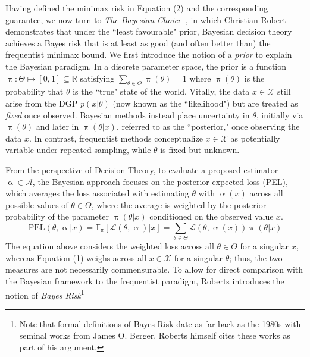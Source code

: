 \documentclass[letterpaper,12pt]{article}
\newcommand{\given}{|}
\begin{document}
Having defined the minimax risk in \hyperref[eq:minimaxrisk]{Equation (2)} and the corresponding guarantee, we now turn to \textit{The Bayesian Choice} \cite{robert2007bayesian}, in which Christian Robert demonstrates that under the ``least favourable" prior, Bayesian decision theory achieves a Bayes risk that is at least as good (and often better than) the frequentist minimax bound. We first introduce the notion of a \textit{prior} to explain the Bayesian paradigm. In a discrete parameter space, the prior is a function $\uppi: \Theta \mapsto [0,1] \subseteq \mathbb{R}$ satisfying $\sum_{\theta \in \Theta} \uppi (\theta) = 1$ where $\uppi(\theta)$ is the probability that $\theta$ is the ``true" state of the world. Vitally, the data $x \in \mathcal{X}$ still arise from the DGP $p(x \given \theta)$ (now known as the ``likelihood") but are treated as \textit{fixed} once observed. Bayesian methods instead place uncertainty in $\theta$, initially via $\uppi(\theta)$ and later in $\uppi(\theta \given x)$, referred to as the ``posterior," once observing the data $x$. In contrast, frequentist methods conceptualize $x \in \mathcal{X}$ as potentially variable under repeated sampling, while $\theta$ is fixed but unknown.


From the perspective of Decision Theory, to evaluate a proposed estimator $\upalpha \in \mathcal{A}$, the Bayesian approach focuses on the posterior expected loss (PEL), which averages the loss associated with estimating $\theta$ with $\upalpha(x)$ across all possible values of $\theta \in \Theta$, where the average is weighted by the posterior probability of the parameter $\uppi(\theta \given x)$ conditioned on the observed value $x$. 
\begin{equation}
	\text{PEL}(\theta, \upalpha \given x) = \mathbb{E}_{\uppi}[\mathcal{L}(\theta, \upalpha)\given x] = \sum_{\theta \in \Theta} \mathcal{L}(\theta, \upalpha(x)) \uppi(\theta \given x) \label{eq:EPL}
\end{equation}
The equation above considers the weighted loss across all $\theta \in \Theta$ for a singular $x$, whereas \hyperref[eq:EL]{Equation (1)} weighs across all $x \in \mathcal{X}$ for a singular $\theta$; thus, the two measures are not necessarily commensurable. To allow for direct comparison with the Bayesian framework to the frequentist paradigm, Roberts introduces the notion of \textit{Bayes Risk}\footnote{Note that formal definitions of Bayes Risk date as far back as the 1980s with seminal works from James O. Berger\cite{berger1985}. Roberts himself cites these works as part of his argument.}
\end{document}
